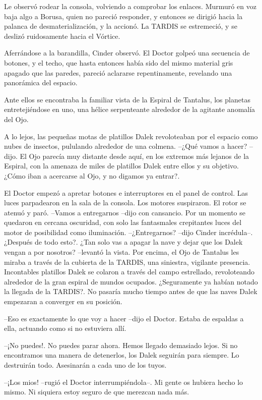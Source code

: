 Le observó rodear la consola, volviendo a comprobar los enlaces. Murmuró en voz baja algo a Borusa, quien no pareció responder, y entonces se dirigió hacia la palanca de desmaterialización, y la accionó. La TARDIS se estremeció, y se deslizó ruidosamente hacia el Vórtice.

Aferrándose a la barandilla, Cinder observó. El Doctor golpeó una secuencia de botones, y el techo, que hasta entonces había sido del mismo material gris apagado que las paredes, pareció aclararse repentinamente, revelando una panorámica del espacio.

Ante ellos se encontraba la familiar vista de la Espiral de Tantalus, los planetas entretejiéndose en uno, una hélice serpenteante alrededor de la agitante anomalía del Ojo.

A lo lejos, las pequeñas motas de platillos Dalek revoloteaban por el espacio como nubes de insectos, pululando alrededor de una colmena.
--¿Qué vamos a hacer? --dijo. El Ojo parecía muy distante desde aquí, en los extremos más lejanos de la Espiral, con la amenaza de miles de platillos Dalek entre ellos y su objetivo. 
¿Cómo iban a acercarse al Ojo, y no digamos ya entrar?.

El Doctor empezó a apretar botones e interruptores en el panel de control. Las luces parpadearon en la sala de la consola. Los motores suspiraron. El rotor se atenuó y paró. 
--Vamos a entregarnos --dijo con cansancio.
Por un momento se quedaron en cercana oscuridad, con solo las fantasmales crepitantes luces del motor de posibilidad como iluminación.
--¿Entregarnos? --dijo Cinder incrédula--. ¿Después de todo esto?. ¿Tan solo vas a apagar la nave y dejar que los Dalek vengan a por nosotros? --levantó la vista. Por encima, el Ojo de Tantalus les miraba a través de la cubierta de la TARDIS, una siniestra, vigilante presencia. Incontables platillos Dalek se colaron a través del campo estrellado, revoloteando alrededor de la gran espiral de mundos ocupados. ¿Seguramente ya habían notado la llegada de la TARDIS?. No pasaría mucho tiempo antes de que las naves Dalek empezaran a converger en su posición.

--Eso es exactamente lo que voy a hacer --dijo el Doctor. Estaba de espaldas a ella, actuando como si no estuviera allí.

--¡No puedes!. No puedes parar ahora. Hemos llegado demasiado lejos. Si no encontramos una manera de detenerlos, los Dalek seguirán para siempre. Lo destruirán todo. Asesinarán a cada uno de los tuyos.

--¡Los mios! --rugió el Doctor interrumpiéndola--. Mi gente os hubiera hecho lo mismo. Ni siquiera estoy seguro de que merezcan nada más.

